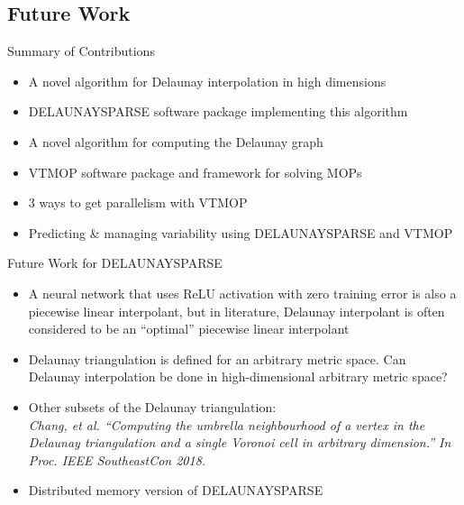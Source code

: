 \documentclass[xcolor=dvipsnames]{beamer}
\begin{document}
\subsection{Future Work}
\begin{frame}{Summary of Contributions}
\begin{itemize}
\item A novel algorithm for Delaunay interpolation in high dimensions
\item DELAUNAYSPARSE software package implementing this algorithm
\item A novel algorithm for computing the Delaunay graph
\item VTMOP software package and framework for solving MOPs
\item 3 ways to get parallelism with VTMOP
\item Predicting \& managing variability using DELAUNAYSPARSE and VTMOP
\end{itemize}
\end{frame}
\begin{frame}{Future Work for DELAUNAYSPARSE}
\begin{itemize}
\item A neural network that uses ReLU activation with zero training error is
also a piecewise linear interpolant, but in literature, Delaunay interpolant
is often considered to be an ``optimal'' piecewise linear interpolant
\item Delaunay triangulation is defined for an arbitrary metric space.
Can Delaunay interpolation be done in high-dimensional arbitrary metric space?
\item Other subsets of the Delaunay triangulation:\\
{\it \small Chang, et al. 
``Computing the umbrella neighbourhood of a vertex in the Delaunay 
triangulation and a single Voronoi cell in arbitrary dimension.''
In Proc. IEEE SoutheastCon 2018.}
\item Distributed memory version of DELAUNAYSPARSE
\end{itemize}
\end{frame}
\end{document}
